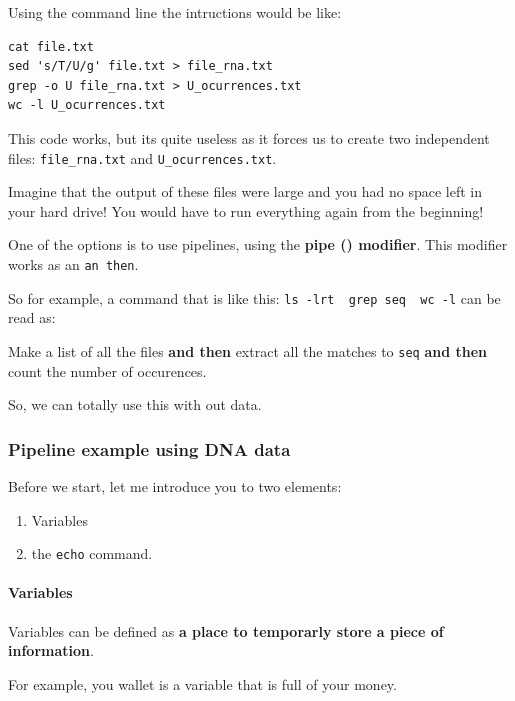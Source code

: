 \documentclass[
]{book}
\providecommand{\tightlist}{%
  \setlength{\itemsep}{0pt}\setlength{\parskip}{0pt}}
\begin{document}
Using the command line the intructions would be like:

\begin{verbatim}
cat file.txt
sed 's/T/U/g' file.txt > file_rna.txt
grep -o U file_rna.txt > U_ocurrences.txt
wc -l U_ocurrences.txt
\end{verbatim}

This code works, but its quite useless as it forces us to create two independent files: \texttt{file\_rna.txt} and \texttt{U\_ocurrences.txt}.

Imagine that the output of these files were large and you had no space left in your hard drive! You would have to run everything again from the beginning!

One of the options is to use pipelines, using the \textbf{pipe (\texttt{\textbar{}}) modifier}. This modifier works as an \texttt{an\ then}.

So for example, a command that is like this: \texttt{ls\ -lrt\ \textbar{}\ grep\ seq\ \textbar{}\ wc\ -l} can be read as:

Make a list of all the files \textbf{and then} extract all the matches to \texttt{seq} \textbf{and then} count the number of occurences.

So, we can totally use this with out data.

\hypertarget{pipeline-example-using-dna-data}{%
\subsubsection{Pipeline example using DNA data}\label{pipeline-example-using-dna-data}}

Before we start, let me introduce you to two elements:

\begin{enumerate}
\def\labelenumi{\arabic{enumi}.}
\tightlist
\item
  Variables
\item
  the \texttt{echo} command.
\end{enumerate}

\hypertarget{variables}{%
\paragraph{Variables}\label{variables}}

Variables can be defined as \textbf{a place to temporarly store a piece of information}.

For example, you wallet is a variable that is full of your money.
\end{document}
